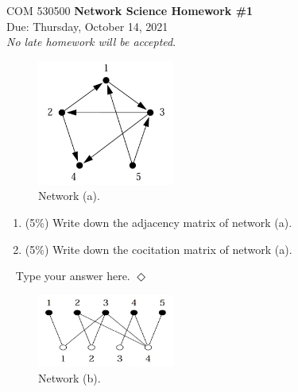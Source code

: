 \documentclass[12pt]{article}
\newcommand {\bsolution}{\noindent {\em Solution:} \ }
\newcommand{\esolution}{\hfill $\Diamond$ \\ \vspace{.3cm}}
\begin{document}
\thispagestyle{empty}
\begin{center}
{\Large \noindent COM 530500 {\bf Network Science Homework \#1} \\
\large {{\sc Due:} Thursday, October 14, 2021}  \\
}
\emph{No late homework will be accepted}.
\end{center}





\bigskip

\begin{figure}[h]
	\centering
	\includegraphics[width=0.4\textwidth]{NS_Hw1_a.jpg}
	\caption{Network (a).}
	\label{NS_Hw1_a}
\end{figure}

\begin{enumerate}[label=(\alph*)]
	\item (5\%) Write down the adjacency matrix of network (a).
	\item (5\%) Write down the cocitation matrix of network (a).
\end{enumerate}

\bsolution
Type your answer here.
\esolution

\begin{figure}[h]
	\centering
	\includegraphics[width=0.4\textwidth]{NS_Hw1_b.jpg}
	\caption{Network (b).}
	\label{NS_Hw1_b}
\end{figure}
\end{document}
